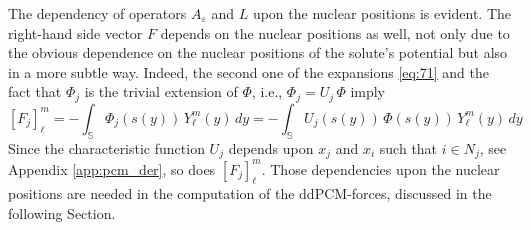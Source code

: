 \documentclass[aip,jcp,a4paper,11pt]{revtex4-1}
\begin{document}
The dependency of operators $A_\varepsilon$ and $L$ upon the nuclear positions is evident. The right-hand side vector $F$ depends on the nuclear positions as well, not only due to the obvious dependence on the nuclear positions of the solute's potential but also in a more subtle way. Indeed, the second one of the expansions \eqref{eq:71} and the fact that $\Phi_j$ is the trivial extension of $\Phi$, i.e., $\Phi_j = U_j \, \Phi$ imply
\begin{equation}\label{eq:25}
[F_j]_\ell^m = - \int_{\mathbb{S}} \Phi_j(s(y)) \, Y_\ell^m(y) \,dy = - \int_{\mathbb{S}} U_j(s(y)) \, \Phi(s(y)) \, Y_\ell^m(y) \,dy
\end{equation}
Since the characteristic function $U_j$ depends upon $x_j$ and $x_i$ such that $i \in N_j$, see Appendix \ref{app:pcm_der}, so does $[F_j]_\ell^m$. 
Those dependencies upon the nuclear positions are needed in the computation of the ddPCM-forces, discussed in the following Section.


%
%
%
\end{document}

